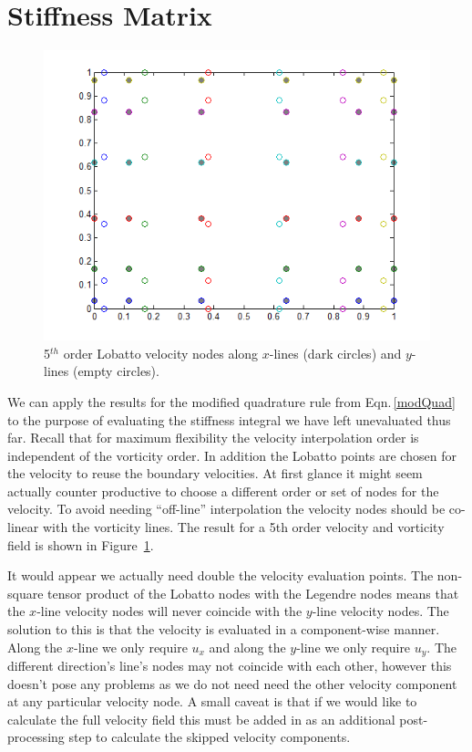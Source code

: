 \documentclass[letterpaper,12pt]{report}
\begin{document}
%
\section{Stiffness Matrix}\label{StiffM}

\begin{figure}
\centering
\includegraphics[width=5.5in]{VelocityLobatto.PNG}
\caption{\label{fig:VelocityLobatto}5$^{th}$ order Lobatto velocity nodes along $x$-lines (dark circles) and $y$-lines (empty circles).}
\end{figure}

We can apply the results for the modified quadrature rule from Eqn.\,\eqref{modQuad} to the purpose of evaluating the stiffness integral we have left unevaluated thus far. Recall that for maximum flexibility the velocity interpolation order is independent of the vorticity order. In addition the Lobatto points are chosen for the velocity to reuse the boundary velocities. At first glance it might seem actually counter productive to choose a different order or set of nodes for the velocity. To avoid needing ``off-line'' interpolation the velocity nodes should be co-linear with the vorticity lines. The result for a 5th order velocity and vorticity field is shown in Figure~\ref{fig:VelocityLobatto}.

It would appear we actually need double the velocity evaluation points. The non-square tensor product of the Lobatto nodes with the Legendre nodes means that the $x$-line velocity nodes will never coincide with the $y$-line velocity nodes. The solution to this is that the velocity is evaluated in a component-wise manner. Along the $x$-line we only require $u_x$ and along the $y$-line we only require $u_y$. The different direction's line's nodes may not coincide with each other, however this doesn't pose any problems as we do not need need the other velocity component at any particular velocity node. A small caveat is that if we would like to calculate the full velocity field this must be added in as an additional post-processing step to calculate the skipped velocity components.
\end{document}
